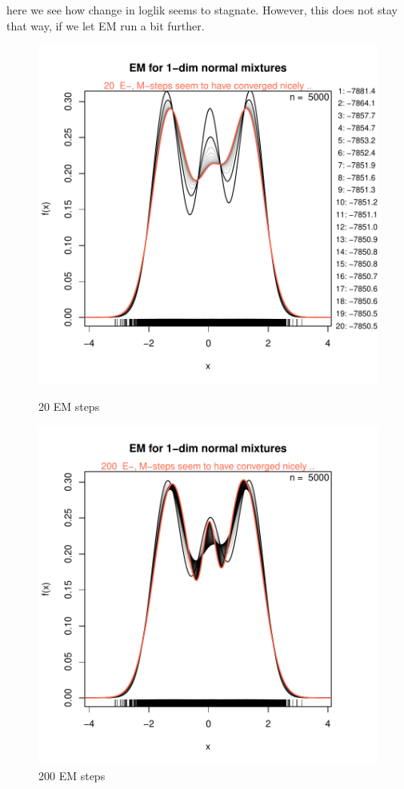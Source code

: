 here we see how change in loglik seems to stagnate. However, this does not stay that way, if we let EM run a bit further.


\begin{figure}[h]
    \centering
    \begin{minipage}{0.45\textwidth}
    \centering
\includegraphics{chapter1-006}
    \caption{20 EM steps}
    \end{minipage}\hfill
    \begin{minipage}{0.45\textwidth}
    \centering
\includegraphics{chapter1-007}
    \caption{200 EM steps}
    \end{minipage}
    \label{adfafdafds}
\end{figure}

